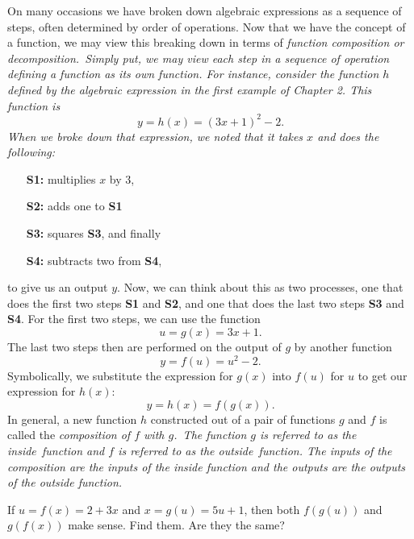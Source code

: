 On many occasions we have broken down algebraic expressions as a sequence of steps, often determined by order of operations. Now that we have the concept of a function, we may view this breaking down in terms of \it{function composition or decomposition}.\ \normalfont Simply put, we may view each step in a sequence of operation defining a function as its own function. For instance, consider the function $h$ defined by the algebraic expression in the first example of Chapter 2. This function is 
\[
 y =  h(x) = (3x+1)^2-2.
\]
When we broke down that expression, we noted that it takes $x$ and does the following:  
\begin{enumerate}
\item[\bf S1:] multiplies $x$ by $3$, 
\item[\bf S2:] adds one to {\bf S1}
\item[\bf S3:] squares {\bf S3},  and finally
\item[\bf S4:] subtracts two from {\bf S4}, 
\end{enumerate}
to give us an output $y$. Now, we can think about this as two processes, one that does the first two steps {\bf S1} and {\bf S2}, and one that does the last two steps {\bf S3} and {\bf S4}.   For the first two steps, we can use the function 
\[
u = g(x) = 3x+1.
\]
The last two steps then are performed on the output of $g$ by another function
\[
y = f(u) = u^2-2.
\]
Symbolically, we substitute the expression for $g(x)$ into $f(u)$ for $u$ to get our expression for $h(x)$:
\[
y = h(x) = f(g(x)).
\]
In general, a new function $h$ constructed out of a pair of functions $g$ and $f$ is called the \it{composition of $f$ with $g$}.\normalfont\ The function $g$ is referred to as the \it{inside\ }\normalfont function and $f$ is referred to as the \it{outside\ }\normalfont function. The inputs of the composition are the inputs of the inside function and the outputs are the outputs of the outside function. 

\par

\begin{question} If $u = f(x) = 2+3x$ and $x=g(u) = 5u+1$, then both $f(g(u))$ and $g(f(x))$ make sense. Find them. Are they the same?
\end{question}

\par 

